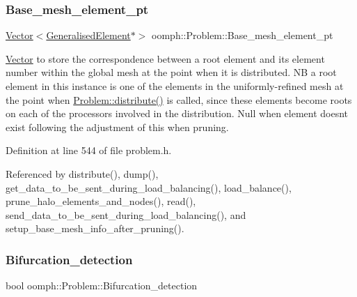 \subsubsection{\texorpdfstring{Base\+\_\+mesh\+\_\+element\+\_\+pt}{Base\_mesh\_element\_pt}}
{\footnotesize\ttfamily \hyperlink{classoomph_1_1Vector}{Vector}$<$\hyperlink{classoomph_1_1GeneralisedElement}{Generalised\+Element}$\ast$$>$ oomph\+::\+Problem\+::\+Base\+\_\+mesh\+\_\+element\+\_\+pt\hspace{0.3cm}{\ttfamily [private]}}



\hyperlink{classoomph_1_1Vector}{Vector} to store the correspondence between a root element and its element number within the global mesh at the point when it is distributed. NB a root element in this instance is one of the elements in the uniformly-\/refined mesh at the point when \hyperlink{classoomph_1_1Problem_aa35e1adc0fdf14b217c7b608eb9cf20b}{Problem\+::distribute()} is called, since these elements become roots on each of the processors involved in the distribution. Null when element doesn\textquotesingle{}t exist following the adjustment of this when pruning. 



Definition at line 544 of file problem.\+h.



Referenced by distribute(), dump(), get\+\_\+data\+\_\+to\+\_\+be\+\_\+sent\+\_\+during\+\_\+load\+\_\+balancing(), load\+\_\+balance(), prune\+\_\+halo\+\_\+elements\+\_\+and\+\_\+nodes(), read(), send\+\_\+data\+\_\+to\+\_\+be\+\_\+sent\+\_\+during\+\_\+load\+\_\+balancing(), and setup\+\_\+base\+\_\+mesh\+\_\+info\+\_\+after\+\_\+pruning().

\mbox{\label{classoomph_1_1Problem_a08dfc704030bb65cea3d9784c5271af0}} 
\subsubsection{\texorpdfstring{Bifurcation\+\_\+detection}{Bifurcation\_detection}}
{\footnotesize\ttfamily bool oomph\+::\+Problem\+::\+Bifurcation\+\_\+detection\hspace{0.3cm}{\ttfamily [protected]}}



